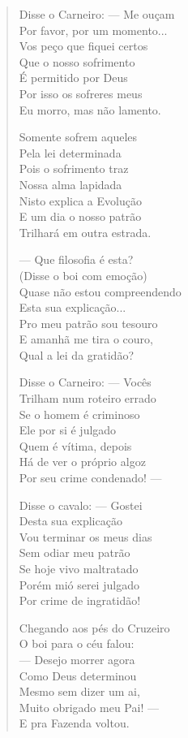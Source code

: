 \begin{verse}
Disse o Carneiro: ---  Me ouçam \\
Por favor, por um momento... \\
Vos peço que fiquei certos \\
Que o nosso sofrimento \\
É permitido por Deus \\
Por isso os sofreres meus \\
Eu morro, mas não lamento. 

Somente sofrem aqueles \\
Pela lei determinada \\
Pois o sofrimento traz \\
Nossa alma lapidada \\
Nisto explica a Evolução \\
E um dia o nosso patrão \\
Trilhará em outra estrada. 

---  Que filosofia é esta? \\
(Disse o boi com emoção) \\
Quase não estou compreendendo \\
Esta sua explicação... \\
Pro meu patrão sou tesouro \\
E amanhã me tira o couro, \\
Qual a lei da gratidão? 
\pagebreak

Disse o Carneiro: ---  Vocês \\
Trilham num roteiro errado \\
Se o homem é criminoso \\
Ele por si é julgado \\
Quem é vítima, depois \\
Há de ver o próprio algoz \\
Por seu crime condenado! ---

Disse o cavalo: ---  Gostei \\
Desta sua explicação \\
Vou terminar os meus dias \\
Sem odiar meu patrão \\
Se hoje vivo maltratado \\
Porém mió serei julgado \\
Por crime de ingratidão! 

Chegando aos pés do Cruzeiro \\
O boi para o céu falou: \\
---  Desejo morrer agora \\
Como Deus determinou \\
Mesmo sem dizer um ai, \\
Muito obrigado meu Pai! ---\\
E pra Fazenda voltou. 


\end{verse}
